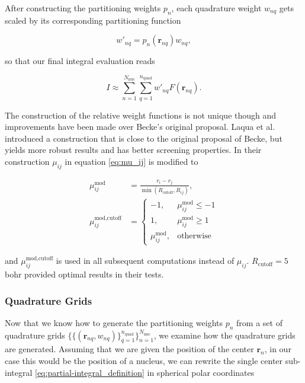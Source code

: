 \documentclass{article}
\begin{document}
After constructing the partitioning weights $p_n$, each quadrature
weight $w_{nq}$ gets scaled by its corresponding partitioning function

\begin{equation}
  w'_{nq} = p_n(\mathbf r_{nq}) w_{nq},
  \label{eq:rescaled_weights}
\end{equation}

so that our final integral evaluation reads

\begin{equation}
  I \approx
  \sum_{n=1}^{N_\text{nuc}}\sum_{q=1}^{n_\text{quad}}w'_{nq}F(\mathbf
  r_{nq}).
\end{equation}

The construction of the relative weight functions is not unique
though and improvements have been made over Becke's original
proposal.
Laqua et al. introduced a construction that is close to the
original proposal of Becke, but yields more robust results and has
better screening properties.\cite{Laqua2018} In their construction
$\mu_{ij}$ in equation \eqref{eq:mu_ij} is modified to

\begin{align}
  \mu_{ij}^{\text{mod}} &= \frac{r_i -
  r_j}{\min(R_{\text{cutoff}}, R_{ij})}, \\
  \mu_{ij}^{\text{mod,cutoff}} &=
  \begin{cases}
    -1 , & \mu_{ij}^{\text{mod}} \leq -1 \\
    1 , & \mu_{ij}^{\text{mod}} \geq 1\\
    \mu_{ij}^{\text{mod}}, & \text{otherwise}
  \end{cases}
  \label{eq:mu_mod}
\end{align}

and $\mu_{ij}^{\text{mod,cutoff}}$ is used in all subsequent
computations instead of $\mu_{ij}$. $R_{\text{cutoff}} = 5$ bohr
provided optimal results in their tests.

\subsubsection{Quadrature Grids}
Now that we know how to generate the partitioning weights $p_n$ from
a set of quadrature grids $\{\{(\mathbf r_{nq},
w_{nq})\}_{q=1}^{n_{\text{quad}}}\}_{n=1}^{N_{\text{nuc}}}$, we
examine how the quadrature grids are generated.
Assuming that we are given the position of the center $\mathbf r_n$,
in our case this would be the position of a nucleus, we can rewrite
the single center sub-integral \eqref{eq:partial-integral_definition}
in spherical polar coordinates
\end{document}
